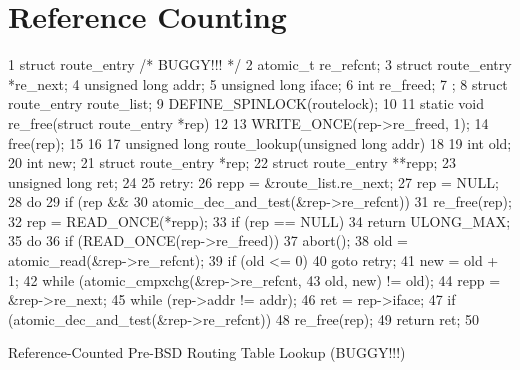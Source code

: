 
\section{Reference Counting}
\label{sec:defer:Reference Counting}

\begin{listing}[tbp]
{ \scriptsize
\begin{verbbox}
 1 struct route_entry { /* BUGGY!!! */
 2   atomic_t re_refcnt;
 3   struct route_entry *re_next;
 4   unsigned long addr;
 5   unsigned long iface;
 6   int re_freed;
 7 };
 8 struct route_entry route_list;
 9 DEFINE_SPINLOCK(routelock);
10
11 static void re_free(struct route_entry *rep)
12 {
13   WRITE_ONCE(rep->re_freed, 1);
14   free(rep);
15 }
16
17 unsigned long route_lookup(unsigned long addr)
18 {
19   int old;
20   int new;
21   struct route_entry *rep;
22   struct route_entry **repp;
23   unsigned long ret;
24
25 retry:
26   repp = &route_list.re_next;
27   rep = NULL;
28   do {
29     if (rep &&
30         atomic_dec_and_test(&rep->re_refcnt))
31       re_free(rep);
32     rep = READ_ONCE(*repp);
33     if (rep == NULL)
34       return ULONG_MAX;
35     do {
36       if (READ_ONCE(rep->re_freed))
37         abort();
38       old = atomic_read(&rep->re_refcnt);
39       if (old <= 0)
40         goto retry;
41       new = old + 1;
42     } while (atomic_cmpxchg(&rep->re_refcnt,
43                             old, new) != old);
44     repp = &rep->re_next;
45   } while (rep->addr != addr);
46   ret = rep->iface;
47   if (atomic_dec_and_test(&rep->re_refcnt))
48     re_free(rep);
49   return ret;
50 }
\end{verbbox}
}
\centering
\theverbbox
\caption{Reference-Counted Pre-BSD Routing Table Lookup (BUGGY!!!)}
\label{lst:defer:Reference-Counted Pre-BSD Routing Table Lookup}
\end{listing}

